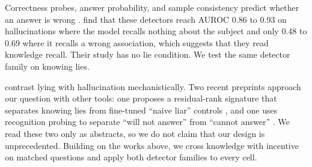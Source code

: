 Correctness probes, answer probability, and sample consistency predict whether an answer is wrong \citep{orgad2024llms,kossen2024semantic}.
\citet{cheang2025llms} find that these detectors reach AUROC 0.86 to 0.93 on hallucinations where the model recalls nothing about the subject and only 0.48 to 0.69 where it recalls a wrong association, which suggests that they read knowledge recall.
Their study has no lie condition.
We test the same detector family on knowing lies.

\citet{huan2025can} contrast lying with hallucination mechanistically.
Two recent preprints approach our question with other tools: one proposes a residual-rank signature that separates knowing lies from fine-tuned ``naive liar'' controls \citep{nyoma2026rift}, and one uses recognition probing to separate ``will not answer'' from ``cannot answer'' \citep{dingeto2026lie}.
We read these two only as abstracts, so we do not claim that our design is unprecedented.
Building on the works above, we cross knowledge with incentive on matched questions and apply both detector families to every cell.
